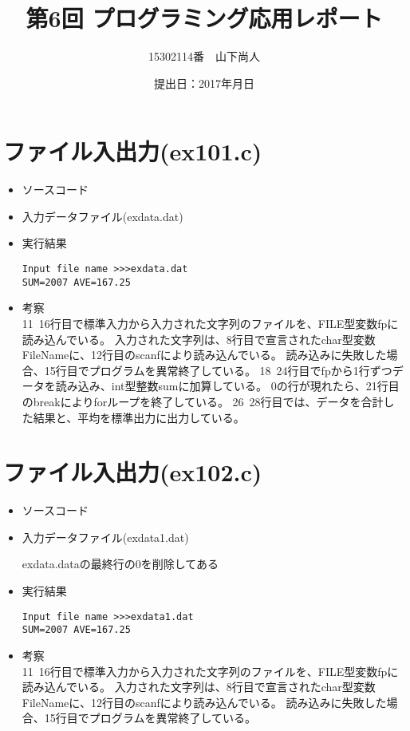 \documentclass[a4paper]{jsarticle}
\title{第6回 プログラミング応用レポート}
\author{15302114番　山下尚人}
\date{提出日：2017年月日}
\begin{document}
\maketitle%

\section{ファイル入出力(ex101.c)}
	\begin{itemize}
	\item ソースコード
		 
		\mbox{}\newline
	\item 入力データファイル(exdata.dat)
		 
		\mbox{}\newline
	\item 実行結果
		\begin{lstlisting}
Input file name >>>exdata.dat
SUM=2007 AVE=167.25
		\end{lstlisting}
		\mbox{}\newline
	\item 考察\mbox{}\\
		 11~16行目で標準入力から入力された文字列のファイルを、FILE型変数fpに読み込んでいる。
		入力された文字列は、8行目で宣言されたchar型変数FileNameに、12行目のscanfにより読み込んでいる。
		読み込みに失敗した場合、15行目でプログラムを異常終了している。
		 18~24行目でfpから1行ずつデータを読み込み、int型整数sumに加算している。
		 0の行が現れたら、21行目のbreakによりforループを終了している。
		  26~28行目では、データを合計した結果と、平均を標準出力に出力している。
	\end{itemize}
	\newpage	%

\section{ファイル入出力(ex102.c)}
	\begin{itemize}
	\item ソースコード
		 
		\mbox{}\newline
	\item 入力データファイル(exdata1.dat)
		 
		\mbox{}\newline
		exdata.dataの最終行の0を削除してある
	\item 実行結果
		\begin{lstlisting}
Input file name >>>exdata1.dat
SUM=2007 AVE=167.25
		\end{lstlisting}
		\mbox{}\newline
	\item 考察\mbox{}\\
		11~16行目で標準入力から入力された文字列のファイルを、FILE型変数fpに読み込んでいる。
		入力された文字列は、8行目で宣言されたchar型変数FileNameに、12行目のscanfにより読み込んでいる。
		読み込みに失敗した場合、15行目でプログラムを異常終了している。
	\end{itemize}
	\newpage	%
\end{document}
